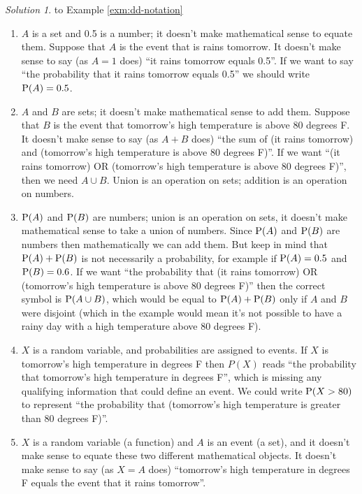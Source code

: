 \documentclass[
]{book}
\providecommand{\tightlist}{%
  \setlength{\itemsep}{0pt}\setlength{\parskip}{0pt}}
\theoremstyle{definition}
\theoremstyle{definition}
\theoremstyle{definition}
\theoremstyle{remark}
\newtheorem*{solution}{Solution}
\begin{document}
\begin{solution}
{}to Example \ref{exm:dd-notation}
\end{solution}

\begin{enumerate}
\def\labelenumi{\arabic{enumi}.}
\tightlist
\item
  \(A\) is a set and 0.5 is a number; it doesn't make mathematical sense to equate them. Suppose that \(A\) is the event that is rains tomorrow. It doesn't make sense to say (as \(A=1\) does) ``it rains tomorrow equals 0.5''. If we want to say ``the probability that it rains tomorrow equals 0.5'' we should write \(\textrm{P}(A) = 0.5\).
\item
  \(A\) and \(B\) are sets; it doesn't make mathematical sense to add them. Suppose that \(B\) is the event that tomorrow's high temperature is above 80 degrees F. It doesn't make sense to say (as \(A+B\) does) ``the sum of (it rains tomorrow) and (tomorrow's high temperature is above 80 degrees F)''. If we want ``(it rains tomorrow) OR (tomorrow's high temperature is above 80 degrees F)'', then we need \(A\cup B\). Union is an operation on sets; addition is an operation on numbers.
\item
  \(\textrm{P}(A)\) and \(\textrm{P}(B)\) are numbers; union is an operation on sets, it doesn't make mathematical sense to take a union of numbers. Since \(\textrm{P}(A)\) and \(\textrm{P}(B)\) are numbers then mathematically we can add them. But keep in mind that \(\textrm{P}(A)+\textrm{P}(B)\) is not necessarily a probability, for example if \(\textrm{P}(A)=0.5\) and \(\textrm{P}(B)=0.6\). If we want ``the probability that (it rains tomorrow) OR (tomorrow's high temperature is above 80 degrees F)'' then the correct symbol is \(\textrm{P}(A\cup B)\), which would be equal to \(\textrm{P}(A)+\textrm{P}(B)\) only if \(A\) and \(B\) were disjoint (which in the example would mean it's not possible to have a rainy day with a high temperature above 80 degrees F).
\item
  \(X\) is a random variable, and probabilities are assigned to events. If \(X\) is tomorrow's high temperature in degrees F then \(P(X)\) reads ``the probability that tomorrow's high temperature in degrees F'', which is missing any qualifying information that could define an event. We could write \(\textrm{P}(X>80)\) to represent ``the probability that (tomorrow's high temperature is greater than 80 degrees F)''.
\item
  \(X\) is a random variable (a function) and \(A\) is an event (a set), and it doesn't make sense to equate these two different mathematical objects. It doesn't make sense to say (as \(X=A\) does) ``tomorrow's high temperature in degrees F equals the event that it rains tomorrow''.

\end{enumerate}
\end{document}
